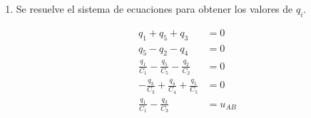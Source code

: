 \begin{enumerate}
\item Se resuelve el sistema de ecuaciones para obtener los valores de
  \(q_i\).

\begin{align*}
  q_1 + q_5 + q_3 &= 0\\
  q_5 - q_2 - q_4 &= 0\\
  \frac{q_1}{C_1} - \frac{q_5}{C_5} - \frac{q_2}{C_2} &= 0\\
  -\frac{q_3}{C_3} + \frac{q_4}{C_4} + \frac{q_5}{C_5} &= 0\\
  \frac{q_1}{C_1} - \frac{q_3}{C_3} &= u_{AB}
\end{align*}

\end{enumerate}

